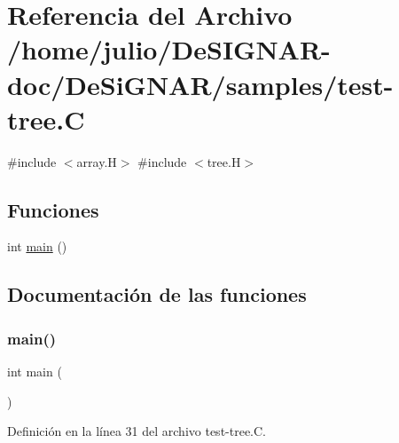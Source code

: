 \hypertarget{test-tree_8_c}{}\section{Referencia del Archivo /home/julio/\+De\+S\+I\+G\+N\+A\+R-\/doc/\+De\+Si\+G\+N\+A\+R/samples/test-\/tree.C}
\label{test-tree_8_c}
{\ttfamily \#include $<$array.\+H$>$}\newline
{\ttfamily \#include $<$tree.\+H$>$}\newline
\subsection*{Funciones}
\begin{DoxyCompactItemize}
\item 
int \hyperlink{test-tree_8_c_ae66f6b31b5ad750f1fe042a706a4e3d4}{main} ()
\end{DoxyCompactItemize}


\subsection{Documentación de las funciones}
\mbox{\label{test-tree_8_c_ae66f6b31b5ad750f1fe042a706a4e3d4}} 
\subsubsection{\texorpdfstring{main()}{main()}}
{\footnotesize\ttfamily int main (\begin{DoxyParamCaption}{ }\end{DoxyParamCaption})}



Definición en la línea 31 del archivo test-\/tree.\+C.


